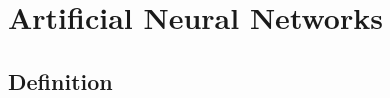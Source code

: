 \documentclass[10pt,compress]{beamer} %
\begin{document}

\section{Artificial Neural Networks}
\subsection{Definition}
\end{document}
